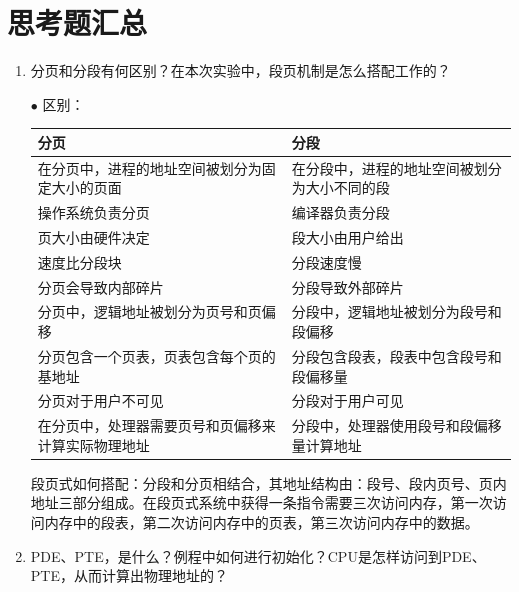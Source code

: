 \documentclass[UTF8,12pt]{ctexart}
\begin{document}
    \section{思考题汇总}
    \begin{enumerate}
        \item 分页和分段有何区别？在本次实验中，段页机制是怎么搭配工作的？
        
        $\bullet$ 区别：
\begin{table}[H]
\centering
\begin{tabular}{|p{7cm}<{\centering}|p{7cm}<{\centering}|}
\hline
\textbf{分页} & \textbf{分段}            \\ \hline
在分页中，进程的地址空间被划分为固定大小的页面            & 在分段中，进程的地址空间被划分为大小不同的段 \\ \hline
操作系统负责分页                           & 编译器负责分段                \\ \hline
页大小由硬件决定                           & 段大小由用户给出               \\ \hline
速度比分段块                             & 分段速度慢                  \\ \hline
分页会导致内部碎片                          & 分段导致外部碎片               \\ \hline
分页中，逻辑地址被划分为页号和页偏移                 & 分段中，逻辑地址被划分为段号和段偏移     \\ \hline
分页包含一个页表，页表包含每个页的基地址               & 分段包含段表，段表中包含段号和段偏移量    \\ \hline
分页对于用户不可见                          & 分段对于用户可见               \\ \hline
在分页中，处理器需要页号和页偏移来计算实际物理地址          & 分段中，处理器使用段号和段偏移量计算地址   \\ \hline
\end{tabular}
\end{table}
    段页式如何搭配：分段和分页相结合，其地址结构由：段号、段内页号、页内地址三部分组成。在段页式系统中获得一条指令需要三次访问内存，第一次访问内存中的段表，第二次访问内存中的页表，第三次访问内存中的数据。
        
    \item PDE、PTE，是什么？例程中如何进行初始化？CPU是怎样访问到PDE、PTE，从而计算出物理地址的？
    

\end{enumerate}
\end{document}
